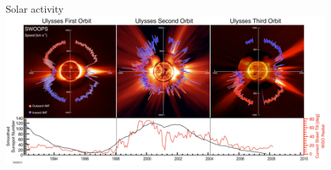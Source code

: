 \begin{frame}[plain,c]{Solar activity}{}
	\centering
	\includegraphics[width=0.9\textwidth]{../figures_of_others/images/McComas2008_Ulysses_orbit_.png}
\end{frame}


